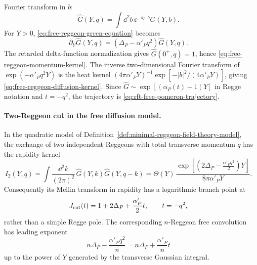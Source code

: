 Fourier transform in \(b\):
\[
  \widehat G(Y,q)=\int\dd^2b\,\ee^{-\ii q\cdot b}G(Y,b).
\]
For \(Y>0\), \eqref{eq:free-reggeon-green-equation} becomes
\[
  \partial_Y\widehat G(Y,q)
  =
  (\Delta_P-\alpha'_P q^2)\widehat G(Y,q).
\]
The retarded delta-function normalization gives
\(\widehat G(0^+,q)=1\), hence
\eqref{eq:free-reggeon-momentum-kernel}.  The inverse two-dimensional
Fourier transform of
\(\exp(-\alpha'_P q^2Y)\) is the heat kernel
\((4\pi\alpha'_PY)^{-1}\exp[-|b|^2/(4\alpha'_PY)]\), giving
\eqref{eq:free-reggeon-diffusion-kernel}.  Since
\(\widehat G\sim\exp[(\alpha_P(t)-1)Y]\) in Regge notation and
\(t=-q^2\), the trajectory is \eqref{eq:rft-free-pomeron-trajectory}.

\paragraph{Two-Reggeon cut in the free diffusion model.}
In the quadratic model of Definition~\ref{def:minimal-reggeon-field-theory-model},
the exchange of two independent Reggeons with total transverse momentum
\(q\) has the rapidity kernel
\begin{equation}
  I_2(Y,q)
  =
  \int\frac{\dd^2k}{(2\pi)^2}\,
  \widehat G(Y,k)\widehat G(Y,q-k)
  =
  \Theta(Y)\,
  \frac{
    \exp\!\left[
      \left(2\Delta_P-\frac{\alpha'_Pq^2}{2}\right)Y
    \right]
  }{8\pi\alpha'_P Y}.
  \label{eq:two-reggeon-diffusion-convolution}
\end{equation}
Consequently its Mellin transform in rapidity has a logarithmic branch point at
\begin{equation}
  J_{\rm cut}(t)
  =
  1+2\Delta_P+\frac{\alpha'_P}{2}t,
  \qquad t=-q^2,
  \label{eq:two-reggeon-cut-trajectory}
\end{equation}
rather than a simple Regge pole.  The corresponding \(n\)-Reggeon free
convolution has leading exponent
\begin{equation}
  n\Delta_P-\frac{\alpha'_P q^2}{n}
  =
  n\Delta_P+\frac{\alpha'_P}{n}t
  \label{eq:n-reggeon-free-cut-exponent}
\end{equation}
up to the power of \(Y\) generated by the transverse Gaussian integral.

